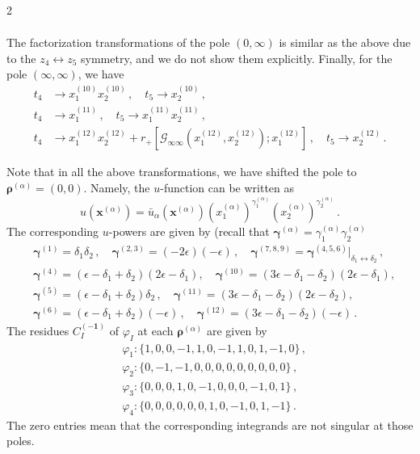 \documentclass[fleqn]{2023SCGE}
\newcommand{\nn}{\nonumber}
\newcommand{\mG}{\mathcal{G}}
\newcommand{\ep}{\epsilon}
\begin{document}
\begin{multicols}{2}
\begin{appendix}
\begin{align}
\end{align}
The factorization transformations of the pole $(0,\infty)$ is similar as the above due to the $z_4 \leftrightarrow z_5$ symmetry, and we do not show them explicitly. Finally, for the pole $(\infty,\infty)$, we have
\begin{align}
t_4 &\to x_1^{(10)} x_2^{(10)} \,, \quad t_5\to x_2^{(10)} \,,
\\
t_4 &\to  x_1^{(11)} \,, \quad t_5\to x_1^{(11)} x_2^{(11)} \,,
\\
t_4 &\to x_1^{(12)} x_2^{(12)} + r_{+}[\mG_{\infty\infty}(x_1^{(12)},x_2^{(12)});x_1^{(12)}] \,, \quad t_5\to x_2^{(12)} \,.
\end{align}

Note that in all the above transformations, we have shifted the pole to $\bm{\rho}^{(\alpha)}=(0,0)$. Namely, the $u$-function can be written as
\begin{equation}
    u(\bm{x}^{(\alpha)}) = \bar{u}_\alpha(\bm{x}^{(\alpha)}) \left( x_1^{(\alpha)} \right)^{\gamma_1^{(\alpha)}} \left( x_2^{(\alpha)} \right)^{\gamma_2^{(\alpha)}} \,.
\end{equation}
The corresponding $u$-powers are given by (recall that $\bm{\gamma}^{(\alpha)} = \gamma_1^{(\alpha)} \gamma_2^{(\alpha)}$
\begin{align}
&\bm{\gamma}^{(1)}=\delta_1 \delta_2 \,, \quad \bm{\gamma}^{(2,3)}=(-2\ep)(-\ep) \,, \quad \bm{\gamma}^{(7,8,9)}= \bm{\gamma}^{(4,5,6)}\Big|_{\delta_1 \leftrightarrow \delta_2} \,,\nn\\
&\bm{\gamma}^{(4)}= \left(\ep-\delta _1+\delta _2\right)\left(2 \ep -\delta_1\right) , \quad \bm{\gamma}^{(10)}=\left(3\ep-\delta _1-\delta _2\right) \left(2 \ep -\delta_1\right),\nn\\
 &\bm{\gamma}^{(5)}= \left(\ep-\delta _1+\delta _2\right)\delta_2 \,, \quad \bm{\gamma}^{(11)}=\left(3\ep-\delta _1-\delta _2\right) \left(2 \ep -\delta_2\right),\nn\\
 &\bm{\gamma}^{(6)}=\left(\ep-\delta _1+\delta _2\right)(-\ep ) \,, \quad \bm{\gamma}^{(12)}=\left(3\ep-\delta _1-\delta _2\right)(-\ep) \,.
\end{align}
The residues $C^{(\bm{-1})}_I$ of $\varphi_{I}$ at each $\bm{\rho}^{(\alpha)}$ are given by
\begin{align}
	&\varphi_{1}:\{1,0,0,-1,1,0,-1,1,0,1,-1,0\}\,,\nn\\
	&\varphi_{2}:\{0,-1,-1,0,0,0,0,0,0,0,0,0\}\,,\nn\\
	&\varphi_{3}:\{0,0,0,1,0,-1,0,0,0,-1,0,1\}\,,\nn\\
	&\varphi_{4}:\{0,0,0,0,0,0,1,0,-1,0,1,-1\}\,.  \label{eq:commonpole2l}
\end{align}
The zero entries mean that the corresponding integrands are not singular at those poles.



\end{appendix}
\end{multicols}
\end{document}
